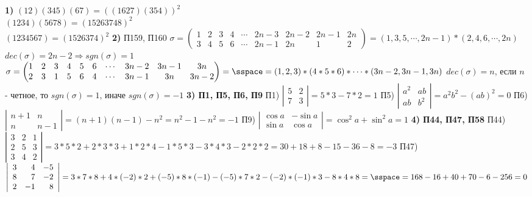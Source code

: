 \documentclass[12pt, a4paper]{article}
\begin{document}
	\textbf{1)} \sspace
	$(12)(345)(67) = ((1627)(354))^2$ \\
	$(1234)(5678) = (15263748)^2$\\
	$(1234567) = (1526374)^2$ \sspace
	\textbf{2)} П159, П160 \sspace
	$\sigma = \begin{pmatrix} 1 & 2 & 3 & 4  & \cdots & 2n - 3 & 2n-2 & 2n-1 & 2n \\ 3 & 4 & 5 & 6  & \cdots & 2n-1 & 2n & 1 & 2\end{pmatrix} = (1, 3, 5, \cdots, 2n - 1) * (2, 4, 6, \cdots, 2n)$ \sspace
	$dec(\sigma) = 2n - 2 \Rightarrow sgn(\sigma) = 1$ \sspace
	$\sigma = \begin{pmatrix} 1 & 2 & 3 & 4 & 5 & 6 & \cdots & 3n - 2 & 3n-1 & 3n \\ 2 & 3 & 1 & 5 & 6 & 4  &\cdots& 3n-1 & 3n & 3n-2\end{pmatrix} = \sspace = (1,2,3)*(4*5*6)*\cdots*(3n-2, 3n-1, 3n)$ \sspace
	$dec(\sigma) = n$, если $n$ - четное, то $sgn(\sigma) = 1$, иначе $sgn(\sigma) = -1$ \sspace
	\textbf{3) П1, П5, П6, П9} \sspace
	П1) $\left | \begin{array}{rr} 5 & 2\\ 7 & 3 \end{array} \right | = 5*3 - 7*2 = 1$ \sspace
	П5) $\left | \begin{array}{rr} a^2 & ab\\ ab & b^2 \end{array} \right | = a^2b^2 - (ab)^2 = 0$ \sspace
	П6) $\left | \begin{array}{rr} n + 1 & n\\ n & n - 1 \end{array} \right | = (n + 1)(n - 1) - n^2 = n^2 - 1 - n^2  = -1$ \sspace
	П9) $\left | \begin{array}{rr} \cos{a} & -\sin{a}\\ \sin{a} & \cos{a} \end{array} \right | = \cos^2{a} + \sin^2{a} = 1$
	\sspace
	\textbf{4) П44, П47, П58} \sspace
	П44) $\left | \begin{array}{rrr} 3 & 2 & 1\\ 2 & 5 & 3\\ 3 & 4 & 2\end{array} \right | = 3 * 5 * 2 + 2 * 3 * 3 + 1 * 2 * 4 - 1 * 5 * 3 - 3 * 4 * 3 - 2 * 2 * 2 = 30 + 18 + 8 - 15 - 36 - 8 = -3$ \bs
	П47) $\left | \begin{array}{rrr} 3 & 4 & -5\\ 8 & 7 & -2 \\ 2 & -1 & 8\end{array} \right | = 3 * 7 * 8 + 4 * (-2) * 2 + (-5)*8*(-1) - (-5)*7*2 - (-2)*(-1)*3 - 8 * 4 * 8 = \sspace = 168 - 16 + 40 + 70 - 6 - 256 = 0$ \bs
\end{document}
